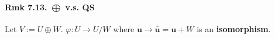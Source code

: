 \paragraph{Rmk 7.13. $\bigoplus$ v.s. QS} Let $V := U \oplus W$. $\varphi: U\rightarrow U/W$ where $\mathbf{u}\rightarrow\bar{\mathbf{u}}=\mathbf{u}+ W$ is an \textbf{isomorphism}. 